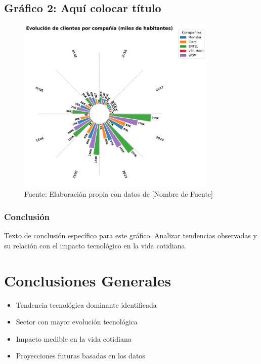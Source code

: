 \documentclass[12pt, a4paper]{article}
\begin{document}
\subsection*{Gráfico 2: Aquí colocar título}
\begin{figure}[H]
    \centering
    \includegraphics[width=0.85\textwidth]{images/graph2_JG.png}
    \caption{Fuente: Elaboración propia con datos de [Nombre de Fuente]}
\end{figure}

\subsubsection*{Conclusión}
Texto de conclusión específico para este gráfico. Analizar tendencias observadas y su relación con el impacto tecnológico en la vida cotidiana.


\section*{Conclusiones Generales}
\begin{itemize}
    \item Tendencia tecnológica dominante identificada
    \item Sector con mayor evolución tecnológica
    \item Impacto medible en la vida cotidiana
    \item Proyecciones futuras basadas en los datos
\end{itemize}
\end{document}
